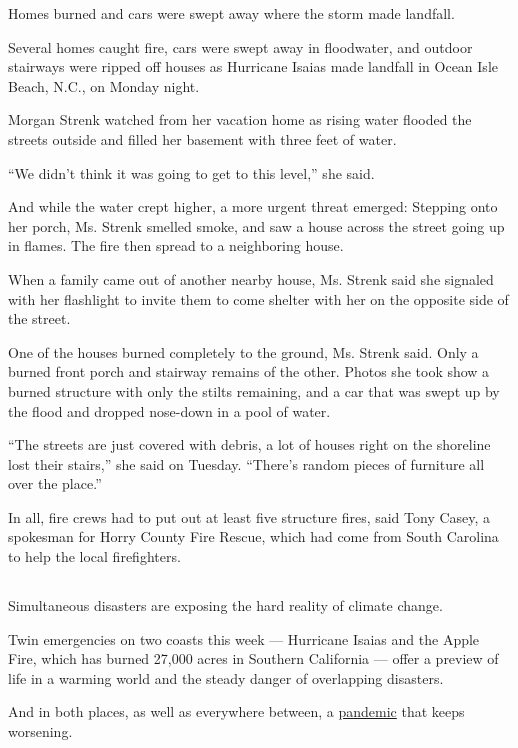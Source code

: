 Homes burned and cars were swept away where the storm made landfall.

Several homes caught fire, cars were swept away in floodwater, and
outdoor stairways were ripped off houses as Hurricane Isaias made
landfall in Ocean Isle Beach, N.C., on Monday night.

Morgan Strenk watched from her vacation home as rising water flooded the
streets outside and filled her basement with three feet of water.

``We didn't think it was going to get to this level,'' she said.

And while the water crept higher, a more urgent threat emerged: Stepping
onto her porch, Ms. Strenk smelled smoke, and saw a house across the
street going up in flames. The fire then spread to a neighboring house.

When a family came out of another nearby house, Ms. Strenk said she
signaled with her flashlight to invite them to come shelter with her on
the opposite side of the street.

One of the houses burned completely to the ground, Ms. Strenk said. Only
a burned front porch and stairway remains of the other. Photos she took
show a burned structure with only the stilts remaining, and a car that
was swept up by the flood and dropped nose-down in a pool of water.

``The streets are just covered with debris, a lot of houses right on the
shoreline lost their stairs,'' she said on Tuesday. ``There's random
pieces of furniture all over the place.''

In all, fire crews had to put out at least five structure fires, said
Tony Casey, a spokesman for Horry County Fire Rescue, which had come
from South Carolina to help the local firefighters.

\hypertarget{-5}{%
\subsection{}\label{-5}}

Simultaneous disasters are exposing the hard reality of climate change.

Twin emergencies on two coasts this week --- Hurricane Isaias and the
Apple Fire, which has burned 27,000 acres in Southern California ---
offer a preview of life in a warming world and the steady danger of
overlapping disasters.

And in both places, as well as everywhere between, a
\href{https://www.nytimes.com/interactive/2020/world/coronavirus-maps.html}{pandemic}
that keeps worsening.

